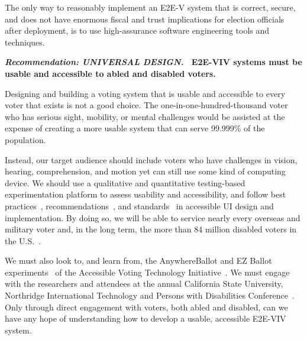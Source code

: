 The only way to reasonably implement an E2E-V system that is correct,
secure, and does not have enormous fiscal and trust implications for
election officials after deployment, is to use high-assurance software
engineering tools and techniques.

\vspace{12pt} \textbf{\emph{Recommendation: UNIVERSAL DESIGN.} \
  E2E-VIV systems must be usable and accessible to abled and disabled
  voters.}

Designing and building a voting system that is usable and accessible
to every voter that exists is not a good choice. The
one-in-one-hundred-thousand voter who has serious sight, mobility, or
mental challenges would be assisted at the expense of creating a more
usable system that can serve 99.999\% of the population.

Instead, our target audience should include voters who have challenges
in vision, hearing, comprehension, and motion yet can still use some
kind of computing device. We should use a qualitative and quantitative
testing-based experimentation platform to assess usability and
accessibility, and follow best
practices~\cite{materials-at-elections.itif.org},
recommendations~\cite{WAI,Section508,WAVE}, and
standards~\cite{ADAStandards} in accessible UI design and
implementation. By doing so, we will be able to service nearly every
overseas and military voter and, in the long term, the more than 84
million disabled voters in the U.S.~\cite{CensusData}.

We must also look to, and learn from, the AnywhereBallot and EZ Ballot
experiments~\cite{AnywhereBallot,lee2012ez} of the Accessible Voting
Technology Initiative~\cite{AVTI}.  We must engage with the
researchers and attendees at the annual California State University,
Northridge International Technology and Persons with Disabilities
Conference~\cite{CSUN}. Only through direct engagement with voters,
both abled and disabled, can we have any hope of understanding how to
develop a usable, accessible E2E-VIV system.

